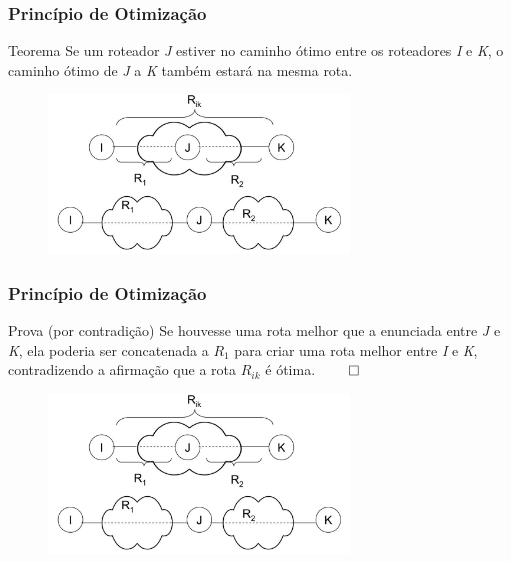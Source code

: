 \documentclass{beamer}
\begin{document}
\begin{frame}
\frametitle{Princípio de Otimização}
\begin{block}{Teorema}
Se um roteador \emph{J} estiver no caminho ótimo entre os roteadores \emph{I} e \emph{K}, o caminho
ótimo de \emph{J} a \emph{K} também estará na mesma rota.
\end{block}
\begin{figure}[htp]
\begin{center}
  \includegraphics[width=80mm]{Imagens/PrincipioOtimizacao.jpeg}
  \label{principio_otimizacao}
\end{center}
\end{figure}
\end{frame}

\begin{frame}
\frametitle{Princípio de Otimização}
\begin{block}{Prova (por contradição)}
Se houvesse uma rota melhor que a enunciada entre \emph{J} e \emph{K}, ela poderia ser
concatenada a $R_1$ para criar uma rota melhor entre \emph{I} e \emph{K}, contradizendo a
afirmação que a rota $R_{ik}$ é ótima. $\qed$
\end{block}
\begin{figure}[htp]
\begin{center}
  \includegraphics[width=80mm]{Imagens/PrincipioOtimizacao.jpeg}
  \label{principio_otimizacao2}
\end{center}
\end{figure}
\end{frame}
\end{document}
